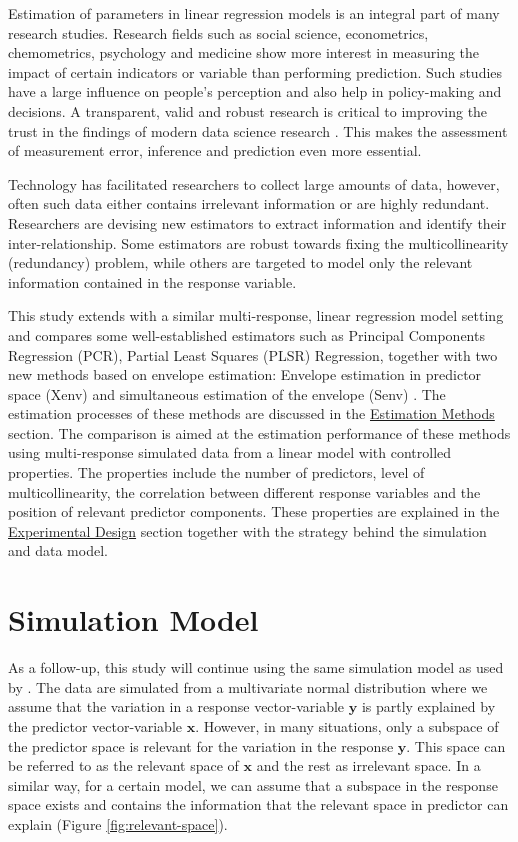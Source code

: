 \documentclass[12pt,3p,authoryear]{elsarticle}
\begin{document}
Estimation of parameters in linear regression models is an integral part of many research studies. Research fields such as social science, econometrics, chemometrics, psychology and medicine show more interest in measuring the impact of certain indicators or variable than performing prediction. Such studies have a large influence on people's perception and also help in policy-making and decisions. A transparent, valid and robust research is critical to improving the trust in the findings of modern data science research \citep{eu2019auethics}. This makes the assessment of measurement error, inference and prediction even more essential.

Technology has facilitated researchers to collect large amounts of data, however, often such data either contains irrelevant information or are highly redundant. Researchers are devising new estimators to extract information and identify their inter-relationship. Some estimators are robust towards fixing the multicollinearity (redundancy) problem, while others are targeted to model only the relevant information contained in the response variable.

This study extends \citep{rimal2019pred} with a similar multi-response, linear regression model setting and compares some well-established estimators such as Principal Components Regression (PCR), Partial Least Squares (PLSR) Regression, together with two new methods based on envelope estimation: Envelope estimation in predictor space (Xenv) \citep{cook2010envelope} and simultaneous estimation of the envelope (Senv) \citep{cook2015simultaneous}. The estimation processes of these methods are discussed in the \protect\hyperlink{estimation-methods}{Estimation Methods} section. The comparison is aimed at the estimation performance of these methods using multi-response simulated data from a linear model with controlled properties. The properties include the number of predictors, level of multicollinearity, the correlation between different response variables and the position of relevant predictor components. These properties are explained in the \protect\hyperlink{experimental-design}{Experimental Design} section together with the strategy behind the simulation and data model.

\hypertarget{simulation-model}{%
\section{Simulation Model}\label{simulation-model}}

As a follow-up, this study will continue using the same simulation model as used by \citet{rimal2019pred}. The data are simulated from a multivariate normal distribution where we assume that the variation in a response vector-variable \(\mathbf{y}\) is partly explained by the predictor vector-variable \(\mathbf{x}\). However, in many situations, only a subspace of the predictor space is relevant for the variation in the response \(\mathbf{y}\). This space can be referred to as the relevant space of \(\mathbf{x}\) and the rest as irrelevant space. In a similar way, for a certain model, we can assume that a subspace in the response space exists and contains the information that the relevant space in predictor can explain (Figure \ref{fig:relevant-space}).
\end{document}
